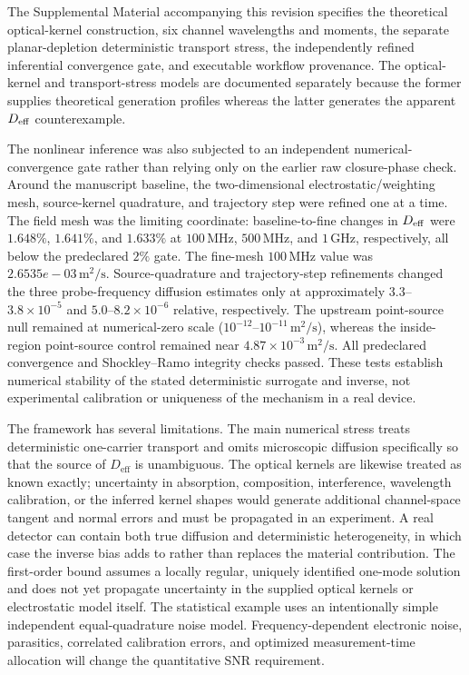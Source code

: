 \documentclass[aps,pra,twocolumn,superscriptaddress,nofootinbib]{revtex4-2}
\newcommand{\Deff}{D_{\mathrm{eff}}}
\begin{document}
The Supplemental Material accompanying this revision specifies the theoretical optical-kernel construction, six channel wavelengths and moments, the separate planar-depletion deterministic transport stress, the independently refined inferential convergence gate, and executable workflow provenance.  The optical-kernel and transport-stress models are documented separately because the former supplies theoretical generation profiles whereas the latter generates the apparent $D_{\rm eff}$ counterexample.

The nonlinear inference was also subjected to an independent numerical-convergence gate rather than relying only on the earlier raw closure-phase check.  Around the manuscript baseline, the two-dimensional electrostatic/weighting mesh, source-kernel quadrature, and trajectory step were refined one at a time.  The field mesh was the limiting coordinate: baseline-to-fine changes in $D_{\rm eff}$ were $1.648\%$, $1.641\%$, and $1.633\%$ at $100\,\mathrm{MHz}$, $500\,\mathrm{MHz}$, and $1\,\mathrm{GHz}$, respectively, all below the predeclared $2\%$ gate.  The fine-mesh $100\,\mathrm{MHz}$ value was $2.6535e-03\,\mathrm{m^2/s}$.  Source-quadrature and trajectory-step refinements changed the three probe-frequency diffusion estimates only at approximately $3.3$--$3.8\times10^{-5}$ and $5.0$--$8.2\times10^{-6}$ relative, respectively.  The upstream point-source null remained at numerical-zero scale ($10^{-12}$--$10^{-11}\,\mathrm{m^2/s}$), whereas the inside-region point-source control remained near $4.87\times10^{-3}\,\mathrm{m^2/s}$.  All predeclared convergence and Shockley--Ramo integrity checks passed.  These tests establish numerical stability of the stated deterministic surrogate and inverse, not experimental calibration or uniqueness of the mechanism in a real device.

The framework has several limitations. The main numerical stress treats deterministic one-carrier transport and omits microscopic diffusion specifically so that the source of $\Deff$ is unambiguous.  The optical kernels are likewise treated as known exactly; uncertainty in absorption, composition, interference, wavelength calibration, or the inferred kernel shapes would generate additional channel-space tangent and normal errors and must be propagated in an experiment. A real detector can contain both true diffusion and deterministic heterogeneity, in which case the inverse bias adds to rather than replaces the material contribution. The first-order bound assumes a locally regular, uniquely identified one-mode solution and does not yet propagate uncertainty in the supplied optical kernels or electrostatic model itself. The statistical example uses an intentionally simple independent equal-quadrature noise model. Frequency-dependent electronic noise, parasitics, correlated calibration errors, and optimized measurement-time allocation will change the quantitative SNR requirement.
\end{document}
